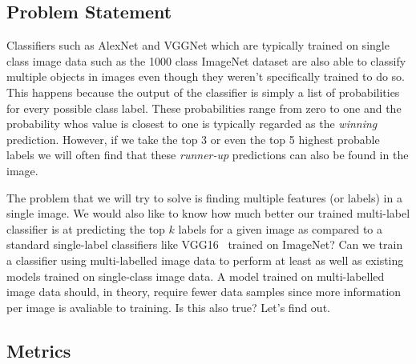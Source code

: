 \documentclass[12pt,journal,compsoc]{IEEEtran}
\begin{document}
\subsection{Problem Statement}




Classifiers such as AlexNet and VGGNet which are typically trained on single class image data such as the 1000 class ImageNet dataset are also able to classify multiple objects in images even though they weren't specifically trained to do so. This happens because the output of the classifier is simply a list of probabilities for every possible class label.  These probabilities range from zero to one and the probability whos value is closest to one is typically regarded as the \textit{winning} prediction.  However, if we take the top 3 or even the top 5 highest probable labels we will often find that these \textit{runner-up} predictions can also be found in the image.  

The problem that we will try to solve is finding multiple features (or labels) in a single image. We would also like to know how much better our trained multi-label classifier is at predicting the top $k$ labels for a given image as compared to a standard single-label classifiers like VGG16~\cite{SimonyanZ14a} trained on ImageNet? Can we train a classifier using multi-labelled image data to perform at least as well as existing models trained on single-class image data.  A model trained on multi-labelled image data should, in theory, require fewer data samples since more information per image is avaliable to training. Is this also true?  Let's find out.


\subsection{Metrics}\label{sec:metrics}
\end{document}
